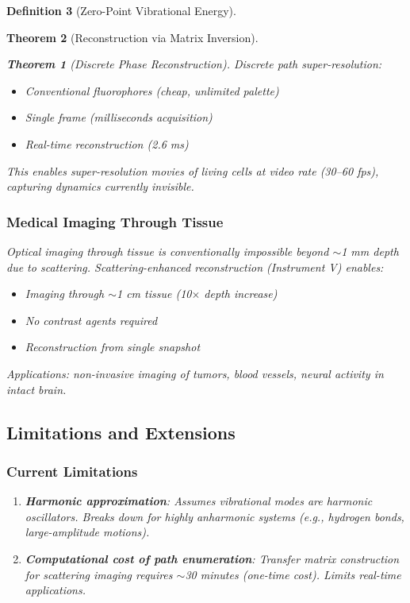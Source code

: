 \documentclass[11pt,a4paper]{article}
\newtheorem{theorem}{Theorem}[section]
\theoremstyle{definition}
\newtheorem{definition}[theorem]{Definition}
\theoremstyle{remark}
\begin{document}
\begin{definition}[Zero-Point Vibrational Energy]
\begin{theorem}[Reconstruction via Matrix Inversion]
\begin{theorem}[Discrete Phase Reconstruction]
Discrete path super-resolution:
\begin{itemize}
\item Conventional fluorophores (cheap, unlimited palette)
\item Single frame (milliseconds acquisition)
\item Real-time reconstruction (2.6 ms)
\end{itemize}

This enables super-resolution movies of living cells at video rate (30--60 fps), capturing dynamics currently invisible.

\subsubsection{Medical Imaging Through Tissue}

Optical imaging through tissue is conventionally impossible beyond $\sim$1 mm depth due to scattering. Scattering-enhanced reconstruction (Instrument V) enables:
\begin{itemize}
\item Imaging through $\sim$1 cm tissue (10$\times$ depth increase)
\item No contrast agents required
\item Reconstruction from single snapshot
\end{itemize}

Applications: non-invasive imaging of tumors, blood vessels, neural activity in intact brain.

\subsection{Limitations and Extensions}

\subsubsection{Current Limitations}

\begin{enumerate}
\item \textbf{Harmonic approximation}: Assumes vibrational modes are harmonic oscillators. Breaks down for highly anharmonic systems (e.g., hydrogen bonds, large-amplitude motions).

\item \textbf{Computational cost of path enumeration}: Transfer matrix construction for scattering imaging requires $\sim$30 minutes (one-time cost). Limits real-time applications.


\end{enumerate}
\end{theorem}
\end{theorem}
\end{definition}
\end{document}
